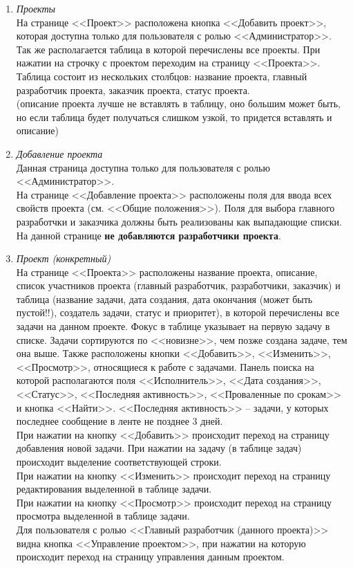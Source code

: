 \documentclass[14pt,a4paper]{extarticle}
\begin{document}
\begin{enumerate}
\begin{enumerate}
				\item{\it Проекты}\\
				На странице <<Проект>> расположена кнопка <<Добавить проект>>, которая доступна только для пользователя с ролью <<Администратор>>.\\
				Так же располагается таблица в которой перечислены все проекты. При нажатии на строчку с проектом переходим на страницу <<Проекта>>. Таблица состоит из нескольких столбцов: название проекта, главный разработчик проекта, заказчик проекта, статус проекта.\\
				\textcolor[rgb]{0.5, 0.5, 0.5}{(описание проекта лучше не вставлять в таблицу, оно большим может быть, но если таблица будет получаться слишком узкой, то придется вставлять и описание)}
				
				\item{\it Добавление проекта}\\
				Данная страница доступна только для пользователя с ролью <<Администратор>>.\\
				На странице <<Добавление проекта>> расположены поля для ввода всех свойств проекта (см. <<Общие положения>>). Поля для выбора главного разработчки и заказчика должны быть реализованы как выпадающие списки.\\
				На данной странице {\bf не добавляются разработчики проекта}.\\
				
				\item {\it Проект (конкретный)}\\
				На странице <<Проекта>> расположены название проекта, описание, список участников проекта (главный разработчик, разработчики, заказчик) и таблица (название задачи, дата создания, дата окончания (может быть пустой!!), создатель задачи, статус и приоритет), в которой перечислены все задачи на данном проекте. Фокус в таблице указывает на первую задачу в списке. Задачи сортируются по <<новизне>>, чем позже создана задаче, тем она выше. Также расположены кнопки <<Добавить>>, <<Изменить>>, <<Просмотр>>, относящиеся к работе с задачами. Панель поиска на которой располагаются поля <<Исполнитель>>, <<Дата создания>>, <<Статус>>, <<Последняя активность>>, <<Проваленные по срокам>> и кнопка <<Найти>>. <<Последняя активность>> -- задачи, у которых последнее сообщение в ленте не позднее 3 дней.\\
				При нажатии на кнопку <<Добавить>> происходит переход на страницу добавления новой задачи.
				При нажатии на задачу (в таблице задач) происходит выделение соответствующей строки.\\
				При нажатии на кнопку <<Изменить>> происходит переход на страницу редактирования выделенной в таблице задачи.\\
				При нажатии на кнопку <<Просмотр>> происходит переход на страницу просмотра выделенной в таблице задачи.\\
				Для пользователя с ролью <<Главный разработчик (данного проекта)>> видна кнопка <<Управление проектом>>, при нажатии на которую происходит переход на страницу управления данным проектом.
				

\end{enumerate}
\end{enumerate}
\end{document}
